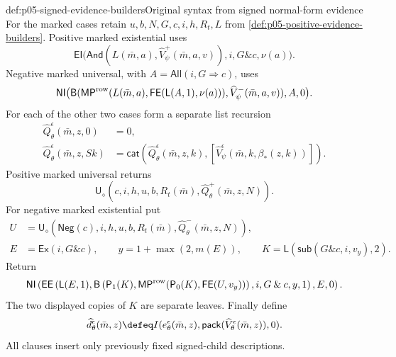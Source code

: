 \begin{hbdefinition}{def:p05-signed-evidence-builders}{Original syntax from signed normal-form evidence}
For the marked cases retain \(u,b,N,G,c,i,h,R_t,L\) from
\cref{def:p05-positive-evidence-builders}. Positive marked existential
uses
\[
 \mathsf{EI}\bigl(\mathsf{And}(L(\bar m,a),
                 \widehat V_\psi^+(\bar m,a,v)),
                                      i,G\mathbin{\&}c,\nu(a)\bigr).
\]
Negative marked universal, with \(A=\mathsf{All}(i,G\Rightarrow c)\),
uses
\[
 \mathsf{NI}\bigl(\mathsf B(
  \mathsf{MP}^{\rm row}(L(\bar m,a),
                    \mathsf{FE}(\mathsf L(A,1),\nu(a))),
                    \widehat V_\psi^-(\bar m,a,v)),A,0\bigr).
\]
For each of the other two cases form a separate list recursion
\[
\begin{aligned}
 \widehat Q_\theta^\epsilon(\bar m,z,0)&=0,\\
 \widehat Q_\theta^\epsilon(\bar m,z,Sk)&=
  \mathsf{cat}(\widehat Q_\theta^\epsilon(\bar m,z,k),
               [\widehat V_\psi^\epsilon(\bar m,k,\beta_*(z,k))]).
\end{aligned}
\]
Positive marked universal returns
\[
 \mathsf U_\diamond(c,i,h,u,b,R_t(\bar m),
                               \widehat Q_\theta^+(\bar m,z,N)).
\]
For negative marked existential put
\[
\begin{aligned}
 U&=\mathsf U_\diamond(\mathsf{Neg}(c),i,h,u,b,R_t(\bar m),
                               \widehat Q_\theta^-(\bar m,z,N)),\\
 E&=\mathsf{Ex}(i,G\mathbin{\&}c),\qquad
 y=1+\max(2,m(E)),\qquad
 K=\mathsf L(\mathsf{sub}(G\mathbin{\&}c,i,v_y),2).
\end{aligned}
\]
Return
\[
 \mathsf{NI}\left(\mathsf{EE}\left(\mathsf L(E,1),
  \mathsf B\left(\mathsf P_1(K),
      \mathsf{MP}^{\rm row}(\mathsf P_0(K),\mathsf{FE}(U,v_y))\right),
                                     i,G\mathbin{\&}c,y,1\right),E,0\right).
\]
The two displayed copies of \(K\) are separate leaves. Finally define
\[
 \widehat d_\theta^\epsilon(\bar m,z)\defeq
  I(e_\theta^\epsilon(\bar m,z),
                         \mathsf{pack}(\widehat V_\theta^\epsilon(\bar m,z)),0).
\]
All clauses insert only previously fixed signed-child descriptions.
\end{hbdefinition}

